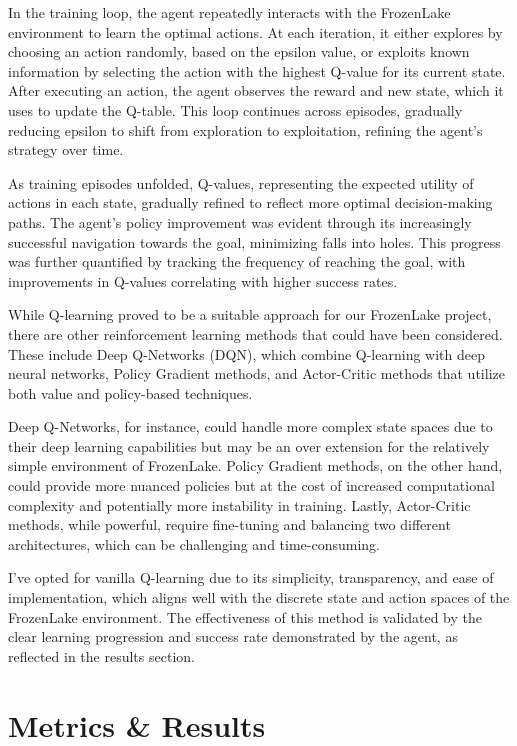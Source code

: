 \documentclass[10pt,twocolumn]{article}
\begin{document}
    
    In the training loop, the agent repeatedly interacts with the FrozenLake environment to learn the optimal actions. At each iteration, it either explores by choosing an action randomly, based on the epsilon value, or exploits known information by selecting the action with the highest Q-value for its current state. After executing an action, the agent observes the reward and new state, which it uses to update the Q-table. This loop continues across episodes, gradually reducing epsilon to shift from exploration to exploitation, refining the agent's strategy over time.
    
    As training episodes unfolded, Q-values, representing the expected utility of actions in each state, gradually refined to reflect more optimal decision-making paths. The agent's policy improvement was evident through its increasingly successful navigation towards the goal, minimizing falls into holes. This progress was further quantified by tracking the frequency of reaching the goal, with improvements in Q-values correlating with higher success rates.

    While Q-learning proved to be a suitable approach for our FrozenLake project, there are other reinforcement learning methods that could have been considered. These include Deep Q-Networks (DQN), which combine Q-learning with deep neural networks, Policy Gradient methods, and Actor-Critic methods that utilize both value and policy-based techniques.

    Deep Q-Networks, for instance, could handle more complex state spaces due to their deep learning capabilities but may be an over extension for the relatively simple environment of FrozenLake. Policy Gradient methods, on the other hand, could provide more nuanced policies but at the cost of increased computational complexity and potentially more instability in training. Lastly, Actor-Critic methods, while powerful, require fine-tuning and balancing two different architectures, which can be challenging and time-consuming.

    I've opted for vanilla Q-learning due to its simplicity, transparency, and ease of implementation, which aligns well with the discrete state and action spaces of the FrozenLake environment. The effectiveness of this method is validated by the clear learning progression and success rate demonstrated by the agent, as reflected in the results section.

\section{Metrics \& Results}
\end{document}
